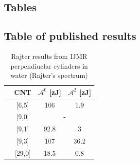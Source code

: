 \documentclass[a4paper]{article}
\begin{document}
\begin{center}

\chapter{Tables}
\section{Table of published results}
\begin{table}[ht]
\caption{Rajter results from IJMR perpendiuclar cylinders in water (Rajter's spectrum)}
\centering
\begin{tabular}{l c|c|c}
  \hline  
  &\hspace{0.25in}CNT \hspace{0.25in}& \hspace{0.25in}$\mathcal{A}^{0}$    [zJ] \hspace{0.25in}& \hspace{0.25in}$\mathcal{A}^{2}$    [zJ] \hspace{0.25in}\\
  \hline\hline 
  &[6,5]  & 106 & 1.9 \\
  \hline
  &[9,0]  & \multicolumn{2}{c}{-}\\
  \hline
  &[9,1]  & 92.8 & 3 \\
  \hline
  &[9,3]  & 107 & 36.2 \\
  \hline
  &[29,0] & 18.5 & 0.8 \\
  \hline  
\end{tabular}
\label{table:nonlin}
\end{table}


\end{center}
\end{document}
